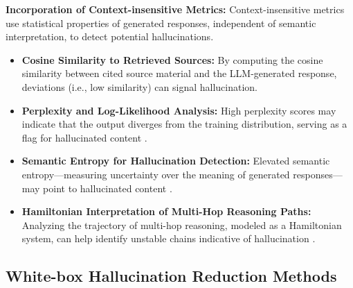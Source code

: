 \noindent\textbf{Incorporation of Context-insensitive Metrics:}  
Context-insensitive metrics use statistical properties of generated responses, independent of semantic interpretation, to detect potential hallucinations.
\begin{itemize}
    \item \textbf{Cosine Similarity to Retrieved Sources:} By computing the cosine similarity between cited source material and the LLM-generated response, deviations (i.e., low similarity) can signal hallucination.
    \item \textbf{Perplexity and Log-Likelihood Analysis:} High perplexity scores may indicate that the output diverges from the training distribution, serving as a flag for hallucinated content \cite{varshney2023stitch}.
    \item \textbf{Semantic Entropy for Hallucination Detection:} Elevated semantic entropy—measuring uncertainty over the meaning of generated responses—may point to hallucinated content \cite{farquhar2024detecting}.
    \item \textbf{Hamiltonian Interpretation of Multi-Hop Reasoning Paths:} Analyzing the trajectory of multi-hop reasoning, modeled as a Hamiltonian system, can help identify unstable chains indicative of hallucination \cite{marin2024optimizing}.
\end{itemize}

\subsection*{White-box Hallucination Reduction Methods}

